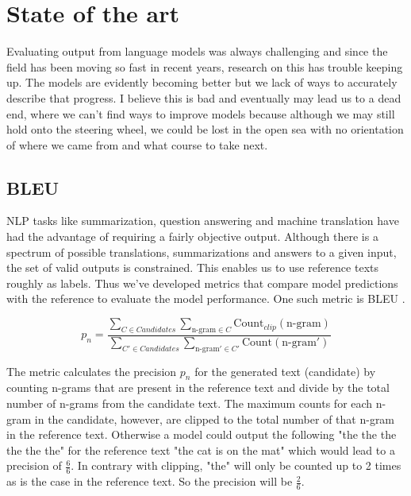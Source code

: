 \section{State of the art} \label{sec:body_state_of_the_art}
Evaluating output from language models was always challenging and since the field has been moving so fast in recent years, research on this has trouble keeping up. The models are evidently becoming better but we lack of ways to accurately describe that progress. I believe this is bad and eventually may lead us to a dead end, where we can't find ways to improve models because although we may still hold onto the steering wheel, we could be lost in the open sea with no orientation of where we came from and what course to take next. 

\subsection{BLEU}
NLP tasks like summarization, question answering and machine translation have had the advantage of requiring a fairly objective output. Although there is a spectrum of possible translations, summarizations and answers to a given input, the set of valid outputs is constrained. This enables us to use reference texts roughly as labels. Thus we've developed metrics that compare model predictions with the reference to evaluate the model performance. One such metric is BLEU \cite{papineni2002bleu}.  

\begin{equation}
p_n = \frac{\sum_{C \in Candidates} \sum_{\text{n-gram} \in C}\text{Count}_{clip}(\text{n-gram})}{\sum_{C' \in Candidates} \sum_{\text{n-gram}' \in C'}\text{Count}(\text{n-gram}')}
\end{equation}

The metric calculates the precision $p_n$ for the generated text (candidate) by counting n-grams that are present in the reference text and divide by the total number of n-grams from the candidate text. The maximum counts for each n-gram in the candidate, however, are clipped to the total number of that n-gram in the reference text. Otherwise a model could output the following "the the the the the the" for the reference text "the cat is on the mat" which would lead to a precision of $\frac{6}{6}$. In contrary with clipping, "the" will only be counted up to 2 times as is the case in the reference text. So the precision will be $\frac{2}{6}$.

